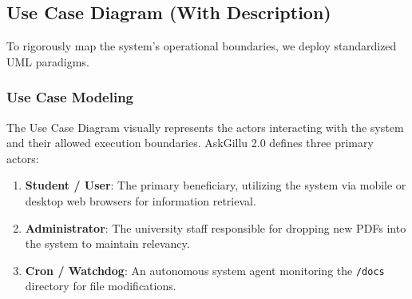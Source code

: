 \documentclass[12pt,a4paper]{report}
\begin{document}
\subsection{Use Case Diagram (With Description)}
To rigorously map the system's operational boundaries, we deploy standardized UML paradigms.

\subsubsection{Use Case Modeling}
The Use Case Diagram visually represents the actors interacting with the system and their allowed execution boundaries. AskGillu 2.0 defines three primary actors:
\begin{enumerate}
    \item \textbf{Student / User}: The primary beneficiary, utilizing the system via mobile or desktop web browsers for information retrieval.
    \item \textbf{Administrator}: The university staff responsible for dropping new PDFs into the system to maintain relevancy.
    \item \textbf{Cron / Watchdog}: An autonomous system agent monitoring the \texttt{/docs} directory for file modifications.
\end{enumerate}
\end{document}
